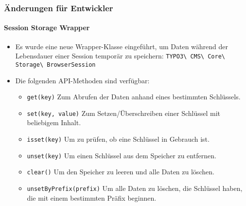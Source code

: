 %

\begin{frame}[fragile]
	\frametitle{Änderungen für Entwickler}
	\framesubtitle{Session Storage Wrapper}


	\begin{itemize}
		\item Es wurde eine neue Wrapper-Klasse eingeführt, um Daten während der Lebensdauer
			einer Session temporär zu speichern:
			\smaller\texttt{TYPO3\textbackslash
				CMS\textbackslash
				Core\textbackslash
				Storage\textbackslash
				BrowserSession}\normalsize
		\item Die folgenden API-Methoden sind verfügbar:
			\vspace{0.1cm}
			\begin{itemize}\smaller
				\item \texttt{get(key)}\newline
					Zum Abrufen der Daten anhand eines bestimmten Schlüssels.
				\item \texttt{set(key, value)}\newline
					Zum Setzen/Überschreiben einer Schlüssel mit beliebigem Inhalt.
				\item \texttt{isset(key)}\newline
					Um zu prüfen, ob eine Schlüssel in Gebrauch ist.
				\item \texttt{unset(key)}\newline
					Um einen Schlüssel aus dem Speicher zu entfernen.
				\item \texttt{clear()}\newline
					Um den Speicher zu leeren und alle Daten zu löschen.
				\item \texttt{unsetByPrefix(prefix)}\newline
				 	Um alle Daten zu löschen, die Schlüssel haben, die mit einem bestimmten Präfix beginnen.
			\end{itemize}\normalsize

	\end{itemize}

\end{frame}

